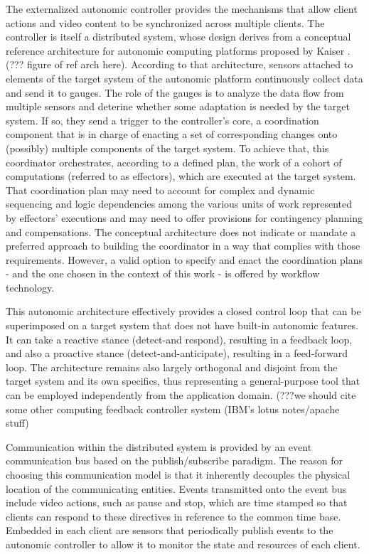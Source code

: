 \documentclass{sig-alternate}
\begin{document}
The externalized autonomic controller provides the mechanisms that
allow client actions and video content to be synchronized across
multiple clients. The controller is itself a distributed system, whose
design derives from a conceptual reference architecture for autonomic
computing platforms proposed by Kaiser \cite{refarch}.  (??? figure of
ref arch here). According to that architecture, sensors attached to
elements of the target system of the autonomic platform continuously
collect data and send it to gauges.  The role of the gauges is to
analyze the data flow from multiple sensors and deterine whether some
adaptation is needed by the target system.  If so, they send a trigger
to the controller's core, a coordination component that is in charge
of enacting a set of corresponding changes onto (possibly) multiple
components of the target system.  To achieve that, this coordinator
orchestrates, according to a defined plan, the work of a cohort of
computations (referred to as effectors), which are executed at the
target system.  That coordination plan may need to account for complex
and dynamic sequencing and logic dependencies among the various units
of work represented by effectors' executions and may need to offer
provisions for contingency planning and compensations. The conceptual
architecture does not indicate or mandate a preferred approach to
building the coordinator in a way that complies with those
requirements.  However, a valid option to specify and enact the
coordination plans - and the one chosen in the context of this work -
is offered by workflow technology.

This autonomic architecture effectively provides a closed control loop
that can be superimposed on a target system that does not have
built-in autonomic features.  It can take a reactive stance
(detect-and respond), resulting in a feedback loop, and also a
proactive stance (detect-and-anticipate), resulting in a feed-forward
loop.  The architecture remains also largely orthogonal and disjoint
from the target system and its own specifics, thus representing a
general-purpose tool that can be employed independently from the
application domain. (???we should cite some other computing feedback
controller system (IBM's lotus notes/apache stuff)


Communication within the distributed system is provided by an event
communication bus based on the publish/subscribe paradigm.  The reason
for choosing this communication model is that it inherently decouples
the physical location of the communicating entities.  Events
transmitted onto the event bus include video actions, such as pause
and stop, which are time stamped so that clients can respond to these
directives in reference to the common time base.  Embedded in each
client are sensors that periodically publish events to the autonomic
controller to allow it to monitor the state and resources of each
client.
\end{document}
